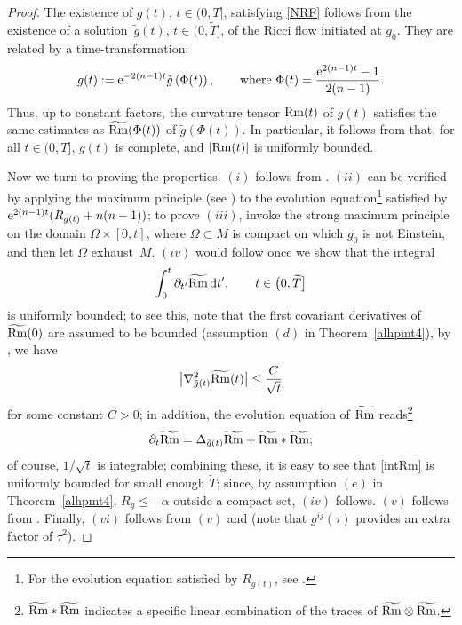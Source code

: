 \documentclass[10pt,a4paper]{amsart}
\numberwithin{equation}{section}
\def\ed{{\rm d}}
\def\Rm{{\rm Rm}}
\def\Rm{{\rm Rm}}
\def\tilRm{\widetilde\Rm}
\begin{document}
\begin{proof}
The existence of $g(t)$, $t\in (0,T]$, satisfying
\eqref{NRF} follows from the existence of a solution~$\tilde g(t)$, $t\in (0,\widetilde T]$, of the Ricci flow initiated at $g_0$.
They are related by a time-transformation:
\[
	g(t):={\rm e}^{-2(n-1)t}\tilde{g}\left(\Phi(t)\right),\qquad\mbox{where } \Phi(t) = \frac{{\rm e}^{2(n-1)t}-1}{2(n-1)}.
\]
Thus, up to constant factors, the curvature tensor $\Rm(t)$ of
$g(t)$ satisfies the same estimates as $\tilRm(\Phi(t))$ of $\tilde{g}(\Phi(t))$.
In particular, it follows from \cite{Shi1989} that, for all $t\in (0,T]$, $g(t)$ is complete, and $|\Rm(t)|$ is uniformly bounded.

Now we turn to proving the properties. $(i)$ follows from \cite[Proposition 3.1]{BW12}.
$(ii)$ can be verified by applying the maximum principle (see \cite[Theorem 7.42]{CLN06}) to
the evolution equation\footnote{For the evolution equation satisfied by $R_{g(t)}$, see \cite[formula~(5.1)]{BW12}.}
satisfied by ${\rm e}^{2(n-1)t}(R_{g(t)}+n(n-1))$;
to prove $(iii)$, invoke the strong maximum principle on the domain $\Omega\times[0,t]$,
 where $\Omega\subset M$ is compact on which $g_0$ is not Einstein,
 and then let $\Omega$ exhaust~$M$.
$(iv)$ would follow once we show that the integral
\begin{equation}\label{intRm}
	\int_{0}^t \partial_{t'}\tilRm\, \ed t', \qquad t\in \bigl(0,\widetilde T\bigr]
\end{equation}
is uniformly bounded;
to see this, note that the first covariant derivatives of $\tilRm(0)$ are assumed to be bounded (assumption $(d)$ in Theorem~\ref{alhpmt4}),
by \cite[Theorem~14.16]{CC2008}, we have
\[
\bigl|\nabla_{\tilde g(t)}^{2}{\tilRm}(t)\bigr|\leq\frac{C}{\sqrt{t}}
\]
for some constant $C>0$; in addition, the evolution equation of $\tilRm$ reads\footnote{${\tilRm}* {\tilRm}$ indicates a specific linear combination of the traces of $\tilRm\otimes\tilRm$.}
\[
\partial_{t}{\tilRm}=\Delta_{\tilde g(t)} {\tilRm}+{\tilRm}* {\tilRm};
\]
of course, $1/\sqrt{t}$ is integrable; combining these,
it is easy to see that \eqref{intRm} is uniformly bounded for small enough $\widetilde T$; since, by
assumption $(e)$ in Theorem~\ref{alhpmt4}, $R_g\le -\alpha$ outside a compact set, $(iv)$ follows.
$(v)$ follows from \cite[Proposition 4.3]{BW12}. Finally, $(vi)$ follows from $(v)$ and  \cite[formulas~(3.19)--(3.21)]{BW12}
(note that $g^{ij}(\tau)$ provides an extra factor of $\tau^2$).
\end{proof}
\end{document}
